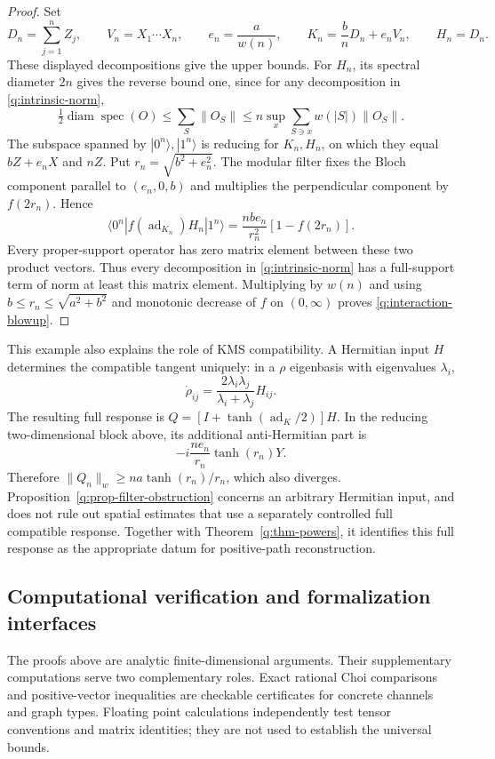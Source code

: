 \begin{proof}
Set
\[
 D_n=\sum_{j=1}^n Z_j,\qquad V_n=X_1\cdots X_n,\qquad
 e_n=\frac a{w(n)},\qquad
 K_n=\frac bnD_n+e_nV_n,
 \qquad H_n=D_n.
\]
These displayed decompositions give the upper bounds.  For $H_n$, its
spectral diameter $2n$ gives the reverse bound one, since for any
decomposition in \eqref{q:intrinsic-norm},
\[
 \tfrac12\operatorname{diam}\operatorname{spec}(O)
 \leq\sum_S\|O_S\|
 \leq n\sup_x\sum_{S\ni x}w(|S|)\|O_S\|.
\]
The subspace spanned by $|0^n\rangle,|1^n\rangle$ is reducing for
$K_n,H_n$, on which they equal $bZ+e_nX$ and $nZ$.  Put
$r_n=\sqrt{b^2+e_n^2}$.  The modular filter fixes the Bloch component
parallel to $(e_n,0,b)$ and multiplies the perpendicular component by
$f(2r_n)$.  Hence
\[
 \langle0^n|f(\operatorname{ad}_{K_n})H_n|1^n\rangle
 =\frac{nbe_n}{r_n^2}[1-f(2r_n)].
\]
Every proper-support operator has zero matrix element between these
two product vectors.  Thus every decomposition in
\eqref{q:intrinsic-norm} has a full-support term of norm at least this
matrix element.  Multiplying by $w(n)$ and using
$b\leq r_n\leq\sqrt{a^2+b^2}$ and monotonic decrease of $f$ on
$(0,\infty)$ proves \eqref{q:interaction-blowup}.
\end{proof}

This example also explains the role of KMS compatibility.  A Hermitian
input $H$ determines the compatible tangent uniquely: in a $\rho$
eigenbasis with eigenvalues $\lambda_i$,
\[
 \dot\rho_{ij}=\frac{2\lambda_i\lambda_j}{\lambda_i+\lambda_j}H_{ij}.
\]
The resulting full response is
$Q=[I+\tanh(\operatorname{ad}_K/2)]H$.  In the reducing two-dimensional
block above, its additional anti-Hermitian part is
\[
 -i\frac{ne_n}{r_n}\tanh(r_n)Y.
\]
Therefore $\|Q_n\|_w\geq na\tanh(r_n)/r_n$, which also diverges.
Proposition~\ref{q:prop-filter-obstruction} concerns an arbitrary
Hermitian input, and does not rule out spatial estimates that use a
separately controlled full compatible response.  Together with
Theorem~\ref{q:thm-powers}, it identifies this full response as the
appropriate datum for positive-path reconstruction.

\subsection{Computational verification and formalization interfaces}

The proofs above are analytic finite-dimensional arguments.  Their
supplementary computations serve two complementary roles.  Exact
rational Choi comparisons and positive-vector inequalities are
checkable certificates for concrete channels and graph types.  Floating
point calculations independently test tensor conventions and matrix
identities; they are not used to establish the universal bounds.

